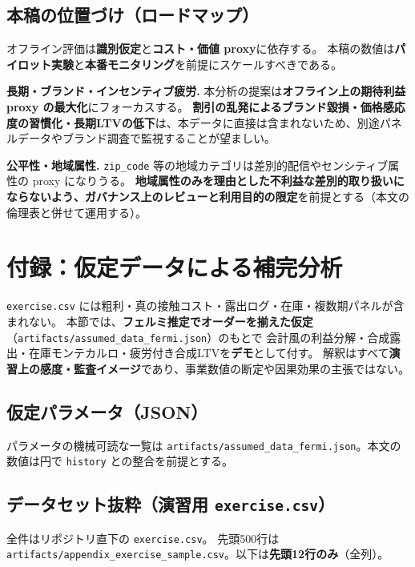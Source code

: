 \documentclass[11pt,a4paper]{article}
\begin{document}
\medskip


\subsection{本稿の位置づけ（ロードマップ）}
オフライン評価は\textbf{識別仮定}と\textbf{コスト・価値 proxy}に依存する。
本稿の数値は\textbf{パイロット実験}と\textbf{本番モニタリング}を前提にスケールすべきである。

\medskip\noindent
\textbf{長期・ブランド・インセンティブ疲労.}
本分析の提案は\textbf{オフライン上の期待利益 proxy の最大化}にフォーカスする。
\textbf{割引の乱発によるブランド毀損・価格感応度の習慣化・長期LTVの低下}は、本データに直接は含まれないため、別途パネルデータやブランド調査で監視することが望ましい。

\medskip\noindent
\textbf{公平性・地域属性.}
\texttt{zip\_code} 等の地域カテゴリは差別的配信やセンシティブ属性の proxy になりうる。
\textbf{地域属性のみを理由とした不利益な差別的取り扱いにならないよう、ガバナンス上のレビューと利用目的の限定}を前提とする（本文の倫理表と併せて運用する）。

\FloatBarrier
\appendix

\newpage
\FloatBarrier
\section{付録：仮定データによる補完分析}
\label{app:assumed-data}

\FloatBarrier
\noindent
\texttt{exercise.csv} には粗利・真の接触コスト・露出ログ・在庫・複数期パネルが含まれない。
本節では、\textbf{フェルミ推定でオーダーを揃えた仮定}（\texttt{artifacts/assumed\_data\_fermi.json}）のもとで
会計風の利益分解・合成露出・在庫モンテカルロ・疲労付き合成LTVを\textbf{デモ}として付す。
解釈はすべて\textbf{演習上の感度・監査イメージ}であり、事業数値の断定や因果効果の主張ではない。





\FloatBarrier
\subsection{仮定パラメータ（JSON）}
\noindent
パラメータの機械可読な一覧は \texttt{artifacts/assumed\_data\_fermi.json}。本文の数値は円で \texttt{history} との整合を前提とする。

\FloatBarrier
\subsection{データセット抜粋（演習用 \texttt{exercise.csv}）}
\noindent
全件はリポジトリ直下の \texttt{exercise.csv}。
先頭500行は \texttt{artifacts/appendix\_exercise\_sample.csv}。以下は\textbf{先頭12行のみ}（全列）。
\end{document}
